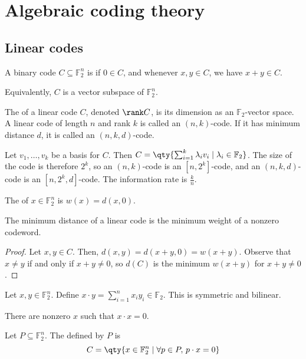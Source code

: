 \section{Algebraic coding theory}

\subsection{Linear codes}
\begin{definition}
    A binary code $C \subseteq \mathbb F_2^n$ is  if $0 \in C$, and whenever $x, y \in C$, we have $x + y \in C$.
\end{definition}
Equivalently, $C$ is a vector subspace of $\mathbb F_2^n$.
\begin{definition}
    The  of a linear code $C$, denoted $\rank C$, is its dimension as an $\mathbb F_2$-vector space.
    A linear code of length $n$ and rank $k$ is called an $(n,k)$-code.
    If it has minimum distance $d$, it is called an $(n,k,d)$-code.
\end{definition}
Let $v_1, \dots, v_k$ be a basis for $C$.
Then $C = \qty{\sum_{i=1}^k \lambda_i v_i \mid \lambda_i \in \mathbb F_2}$.
The size of the code is therefore $2^k$, so an $(n,k)$-code is an $[n,2^k]$-code, and an $(n,k,d)$-code is an $[n,2^k,d]$-code.
The information rate is $\frac{k}{n}$.
\begin{definition}
    The  of $x \in \mathbb F_2^n$ is $w(x) = d(x,0)$.
\end{definition}
\begin{lemma}
    The minimum distance of a linear code is the minimum weight of a nonzero codeword.
\end{lemma}
\begin{proof}
    Let $x, y \in C$.
    Then, $d(x,y) = d(x+y,0) = w(x+y)$.
    Observe that $x \neq y$ if and only if $x + y \neq 0$, so $d(C)$ is the minimum $w(x+y)$ for $x + y \neq 0$.
\end{proof}
\begin{definition}
    Let $x, y \in \mathbb F_2^n$.
    Define $x \cdot y = \sum_{i=1}^n x_i y_i \in \mathbb F_2$.
    This is symmetric and bilinear.
\end{definition}
There are nonzero $x$ such that $x \cdot x = 0$.
\begin{definition}
    Let $P \subseteq \mathbb F_2^n$.
    The  defined by $P$ is
    \[ C = \qty{x \in \mathbb F_2^n \mid \forall p \in P,\,p \cdot x = 0} \]
\end{definition}
